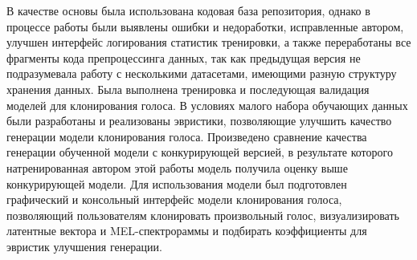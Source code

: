 \documentclass[oneside,final,14pt]{extreport}
\begin{document}
В качестве основы была использована кодовая база репозитория\cite{bib:voice_cloning}, однако в процессе работы были выявлены ошибки и недоработки, исправленные автором, улучшен интерфейс логирования статистик тренировки, а также переработаны все фрагменты кода препроцессинга данных, так как предыдущая версия не подразумевала работу с несколькими датасетами, имеющими разную структуру хранения данных. Была выполнена тренировка и последующая валидация моделей для клонирования голоса. В условиях малого набора обучающих данных были разработаны и реализованы эвристики, позволяющие улучшить качество генерации модели клонирования голоса. Произведено сравнение качества генерации обученной модели с конкурирующей версией\cite{bib:russian_voice_cloning}, в результате которого натренированная автором этой работы модель получила оценку выше конкурирующей модели. Для использования модели был подготовлен графический и консольный интерфейс модели клонирования голоса, позволяющий пользователям клонировать произвольный голос, визуализировать латентные вектора и MEL-спектрораммы и подбирать коэффициенты для эвристик улучшения генерации. 
\newpage
\end{document}
